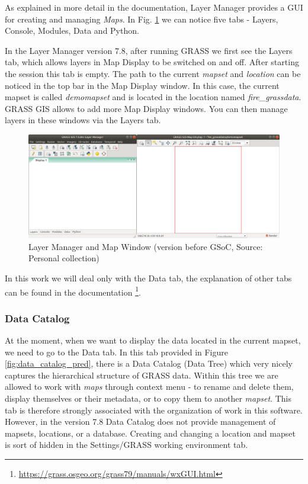 \documentclass[a4paper,10pt,twoside]{article}
\begin{document}
As explained in more detail in the documentation, Layer Manager provides a GUI for creating and managing \textit{Maps}. In Fig. \ref{fig:empty_layers1} we can notice five tabs - Layers, Console, Modules, Data and Python.

In the Layer Manager version 7.8, after running GRASS we first see the Layers tab, which allows layers in Map Display to be switched on and off. After starting the session this tab is empty. The path to the current \textit{mapset} and \textit{location} can be noticed in the top bar in the Map Display window. In this case, the current mapset is called \textit{demomapset} and is located in the location named \textit{fire\_grassdata}. GRASS GIS allows to add more Map Display windows. You can then manage layers in these windows via the Layers tab.
\vspace{0.3cm}
\begin{figure}[hbt!] 
\begin{center}
\includegraphics[width=17cm]{../pictures/empty_layers1.png} 
\caption[Layer Manager and Map Window (version before GSoC)]{Layer Manager and Map Window  (version before GSoC, Source: Personal collection)}
\label{fig:empty_layers1}
\end{center}
\end{figure}

\noindent In this work we will deal only with the Data tab, the explanation of other tabs can be found in the documentation \footnote{\url{https://grass.osgeo.org/grass79/manuals/wxGUI.html}}.
 
\newpage
\vspace*{-1cm}
\subsubsection{Data Catalog}

At the moment, when we want to display the data located in the current mapset, we need to go to the Data tab. In this tab provided in Figure \ref{fig:data_catalog_pred}, there is a Data Catalog (Data Tree) which very nicely captures the hierarchical structure of GRASS data. Within this tree we are allowed to work with \textit{maps} through context menu - to rename and delete them, display themselves or their metadata, or to copy them to another \textit{mapset}. This tab is therefore strongly associated with the organization of work in this software. However, in the version 7.8 Data Catalog does not provide management of mapsets, locations, or a database. Creating and changing a location and mapset is sort of hidden in the Settings/GRASS working environment tab.
\end{document}
